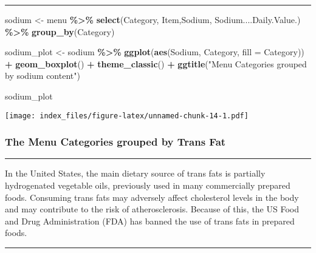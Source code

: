 \documentclass[
]{article}
\newenvironment{Shaded}{\begin{snugshade}}{\end{snugshade}}
\newcommand{\AttributeTok}[1]{\textcolor[rgb]{0.13,0.29,0.53}{#1}}
\newcommand{\FunctionTok}[1]{\textcolor[rgb]{0.13,0.29,0.53}{\textbf{#1}}}
\newcommand{\NormalTok}[1]{#1}
\newcommand{\OtherTok}[1]{\textcolor[rgb]{0.56,0.35,0.01}{#1}}
\newcommand{\SpecialCharTok}[1]{\textcolor[rgb]{0.81,0.36,0.00}{\textbf{#1}}}
\newcommand{\StringTok}[1]{\textcolor[rgb]{0.31,0.60,0.02}{#1}}
\begin{document}
\begin{center}\rule{0.5\linewidth}{0.5pt}\end{center}

\begin{Shaded}
\begin{Highlighting}[]
\NormalTok{sodium  }\OtherTok{\textless{}{-}}\NormalTok{ menu }\SpecialCharTok{\%\textgreater{}\%}
  \FunctionTok{select}\NormalTok{(Category,}
\NormalTok{         Item,Sodium,}
\NormalTok{         Sodium....Daily.Value.) }\SpecialCharTok{\%\textgreater{}\%} 
  \FunctionTok{group\_by}\NormalTok{(Category)}


\NormalTok{sodium\_plot }\OtherTok{\textless{}{-}}\NormalTok{ sodium }\SpecialCharTok{\%\textgreater{}\%} 
  \FunctionTok{ggplot}\NormalTok{(}\FunctionTok{aes}\NormalTok{(Sodium,}
\NormalTok{             Category,}
             \AttributeTok{fill =}\NormalTok{ Category)) }\SpecialCharTok{+}
  \FunctionTok{geom\_boxplot}\NormalTok{() }\SpecialCharTok{+} \FunctionTok{theme\_classic}\NormalTok{() }\SpecialCharTok{+} \FunctionTok{ggtitle}\NormalTok{(}\StringTok{"Menu Categories grouped by sodium content"}\NormalTok{)}


\NormalTok{sodium\_plot}
\end{Highlighting}
\end{Shaded}

\texttt{[image: index\_files/figure-latex/unnamed-chunk-14-1.pdf]}

\hypertarget{the-menu-categories-grouped-by-trans-fat}{%
\subsubsection{The Menu Categories grouped by Trans
Fat}\label{the-menu-categories-grouped-by-trans-fat}}

\begin{center}\rule{0.5\linewidth}{0.5pt}\end{center}

In the United States, the main dietary source of trans fats is partially
hydrogenated vegetable oils, previously used in many commercially
prepared foods. Consuming trans fats may adversely affect cholesterol
levels in the body and may contribute to the risk of atherosclerosis.
Because of this, the US Food and Drug Administration (FDA) has banned
the use of trans fats in prepared foods.

\begin{center}\rule{0.5\linewidth}{0.5pt}\end{center}
\end{document}
